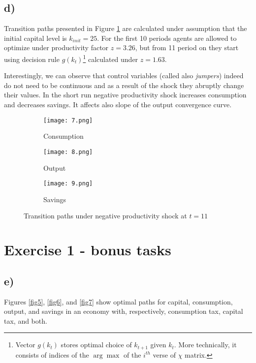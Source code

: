 \documentclass{article}
\begin{document}
\subsection*{d)}

Transition paths presented in Figure \ref{fig4} are calculated under assumption that the initial capital level is $k_{init}=25$. For the first 10 periods agents are allowed to optimize under productivity factor $z=3.26$, but from 11 period on they start using decision rule $g(k_{t})$\footnote{Vector $g(k_{t})$ stores optimal choice of $k_{t+1}$ given $k_{t}$. More technically, it consists of indices of the $\arg \max$ of the $i^{th}$ verse of $\chi$ matrix.} calculated under $z=1.63$.

Interestingly, we can observe that control variables (called also \textit{jumpers}) indeed do not need to be continuous and as a result of the shock they abruptly change their values. In the short run negative productivity shock increases consumption and decreases savings. It affects also slope of the output convergence curve.

\begin{figure}[H]
\centering
\begin{subfigure}{\textwidth}
  \centering
  \texttt{[image: 7.png]}
    \caption{Consumption}
\end{subfigure}

\begin{subfigure}{\textwidth}
  \centering
  \texttt{[image: 8.png]}
  \caption{Output}
\end{subfigure}

\begin{subfigure}{\textwidth}
  \centering
  \texttt{[image: 9.png]}
  \caption{Savings}
\end{subfigure}

\caption{Transition paths under negative productivity shock at $t=11$}
\label{fig4}
\end{figure}

\section*{Exercise 1 - bonus tasks}

\subsection*{e)}

Figures \ref{fig5}, \ref{fig6}, and \ref{fig7} show optimal paths for capital, consumption, output, and savings in an economy with, respectively, consumption tax, capital tax, and both.
\end{document}
